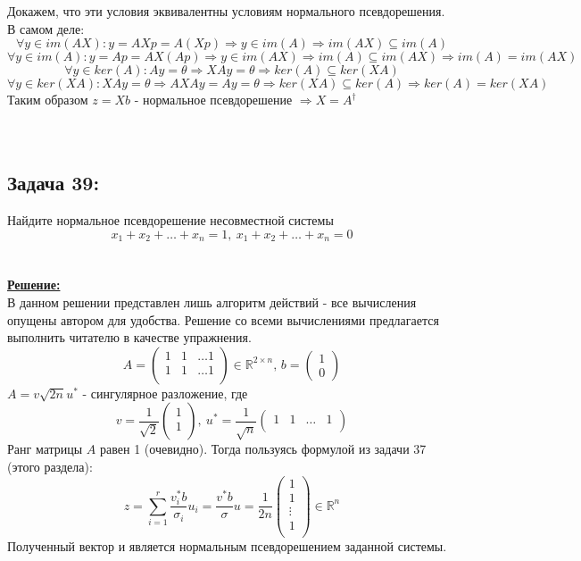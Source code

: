 \documentclass[a4paper,12pt,titlepage,final]{article}
\begin{document}
Докажем, что эти условия эквивалентны условиям нормального псевдорешения. В самом деле:
$$\forall y \in im(AX): y = AXp = A(Xp) \Rightarrow y \in im(A) \Rightarrow im(AX) \subseteq im(A)$$
$$\forall y \in im(A): y = Ap = AX(Ap) \Rightarrow y \in im(AX) \Rightarrow im(A) \subseteq im(AX) \Rightarrow im(A) = im(AX)$$
$$\forall y \in ker(A): Ay = \theta \Rightarrow XAy = \theta \Rightarrow ker(A) \subseteq ker(XA)$$
$$\forall y \in ker(XA): XAy = \theta \Rightarrow AXAy = Ay = \theta \Rightarrow ker(XA) \subseteq ker(A) \Rightarrow ker(A) = ker(XA)$$
Таким образом $z = Xb$ - нормальное псевдорешение $\Rightarrow X = A^\dagger$ \blacksquare \\ \\ \\

\subsection*{Задача 39:}
\noindent Найдите нормальное псевдорешение несовместной системы 
$$x_1 + x_2 + \ldots + x_n = 1, \: x_1 + x_2 + \ldots + x_n = 0$$\\ \\
\textbf{\underline{Решение:}} \\
В данном решении представлен лишь алгоритм действий - все вычисления опущены автором для удобства. Решение со всеми вычислениями предлагается выполнить читателю в качестве упражнения.
$$A = \begin{pmatrix} 1 & 1 & \ldots 1 \\ 1 & 1 & \ldots 1 \\ \end{pmatrix} \in \mathbb{R}^{2 \times n},\, b = \begin{pmatrix} 1 \\ 0 \end{pmatrix}$$
$A = v\sqrt{2n}u^*$ - сингулярное разложение, где 
$$v = \frac{1}{\sqrt{2}}\begin{pmatrix} 1 \\ 1 \\ \end{pmatrix}, \: u^* = \frac{1}{\sqrt{n}}\begin{pmatrix} 1 & 1 & \ldots & 1 \\ \end{pmatrix}$$
Ранг матрицы $A$ равен 1 (очевидно). Тогда пользуясь формулой из задачи 37 (этого раздела):
$$z = \sum_{i=1}^r \frac{v_i^* b}{\sigma_i}u_i = \frac{v^*b}{\sigma}u = \frac{1}{2n} 
\begin{pmatrix}
1 \\ 1 \\ \vdots \\ 1 \\
\end{pmatrix} \in \mathbb{R}^n $$
Полученный вектор и является нормальным псевдорешением заданной системы. \blacksquare \\ \\ \\
\end{document}
